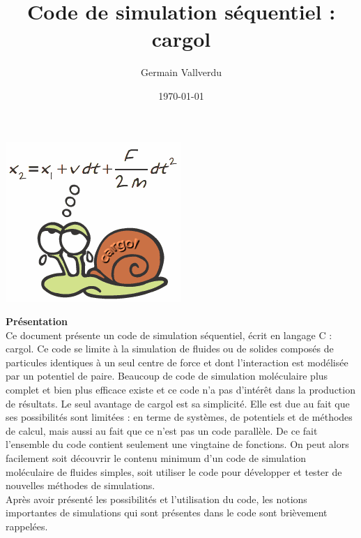 \documentclass[11pt,a4paper,fleqn]{book}
\title{Code de simulation séquentiel : cargol}
\author{Germain Vallverdu}
\date{\today}
\begin{document}
\renewcommand{\labelitemi}{\hspace{3ex} $\bullet$} 
\renewcommand{\figurename}{figure}
\renewcommand{\tablename}{tableau}
\onehalfspacing

\thispagestyle{empty}
\maketitle

\begin{center}\includegraphics[scale=0.5]{logo}\end{center}

\vspace{2\baselineskip}


\begin{center}
\begin{minipage}{0.9\textwidth}
	\noindent\textbf{\large Présentation}\vspace*{0.7ex} \\
	Ce document présente un code de simulation séquentiel, écrit en langage C : cargol. 
	Ce code se limite à la simulation de fluides ou de solides composés de 
	particules identiques à un seul centre de force et dont l'interaction 
	est modélisée par un potentiel de paire. Beaucoup de code de simulation 
	moléculaire plus complet et bien plus efficace existe et ce code n'a pas
	d'intérêt dans la production de résultats.
	Le seul avantage de cargol est sa simplicité. Elle est due au fait que ses 
	possibilités sont limitées : en terme de systèmes, de potentiels et de 
	méthodes de calcul, mais aussi au fait que ce n'est pas un code parallèle.
	De ce fait l'ensemble du code contient seulement une vingtaine de fonctions.
	On peut alors facilement soit découvrir le contenu minimum d'un code de 
	simulation moléculaire de fluides simples, soit utiliser le code pour 
	développer et tester de nouvelles méthodes de simulations. \\
	
	Après avoir présenté les possibilités et l'utilisation du code, les notions 
	importantes de simulations qui sont présentes dans le code sont brièvement 
	rappelées.
\end{minipage}
\end{center}
\end{document}
